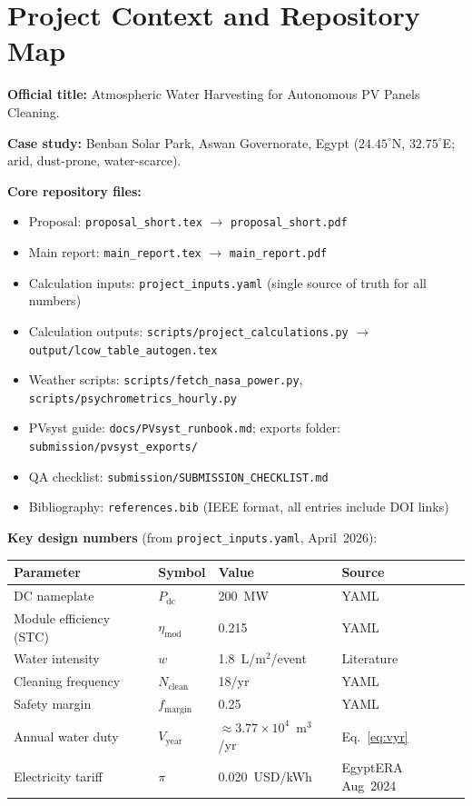 \documentclass[11pt,a4paper]{article}
\begin{document}
\section{Project Context and Repository Map}

\textbf{Official title:} Atmospheric Water Harvesting for Autonomous PV Panels Cleaning.

\textbf{Case study:} Benban Solar Park, Aswan Governorate, Egypt
($24.45^\circ$N, $32.75^\circ$E; arid, dust-prone, water-scarce).

\textbf{Core repository files:}
\begin{itemize}[nosep]
  \item Proposal: \texttt{proposal\_short.tex} $\rightarrow$ \texttt{proposal\_short.pdf}
  \item Main report: \texttt{main\_report.tex} $\rightarrow$ \texttt{main\_report.pdf}
  \item Calculation inputs: \texttt{project\_inputs.yaml} (single source of truth for all numbers)
  \item Calculation outputs: \texttt{scripts/project\_calculations.py} $\rightarrow$ \texttt{output/lcow\_table\_autogen.tex}
  \item Weather scripts: \texttt{scripts/fetch\_nasa\_power.py}, \texttt{scripts/psychrometrics\_hourly.py}
  \item PVsyst guide: \texttt{docs/PVsyst\_runbook.md}; exports folder: \texttt{submission/pvsyst\_exports/}
  \item QA checklist: \texttt{submission/SUBMISSION\_CHECKLIST.md}
  \item Bibliography: \texttt{references.bib} (IEEE format, all entries include DOI links)
\end{itemize}

\textbf{Key design numbers} (from \texttt{project\_inputs.yaml}, April~2026):
\begin{center}
\small
\renewcommand{\arraystretch}{1.2}
\begin{tabular}{@{}llll@{}}
\toprule
Parameter & Symbol & Value & Source \\
\midrule
DC nameplate & $P_{\mathrm{dc}}$ & 200~MW & YAML \\
Module efficiency (STC) & $\eta_{\mathrm{mod}}$ & 0.215 & YAML \\
Water intensity & $w$ & 1.8~L/m$^2$/event & Literature \cite{mejia2021cleaning} \\
Cleaning frequency & $N_{\mathrm{clean}}$ & 18/yr & YAML \\
Safety margin & $f_{\mathrm{margin}}$ & 0.25 & YAML \\
Annual water duty & $V_{\mathrm{year}}$ & $\approx 3.77\times 10^4$~m$^3$/yr & Eq.~\eqref{eq:vyr} \\
Electricity tariff & $\pi$ & 0.020~USD/kWh & EgyptERA Aug~2024 \cite{egyptera_tariff} \\
\bottomrule
\end{tabular}
\end{center}
\end{document}
